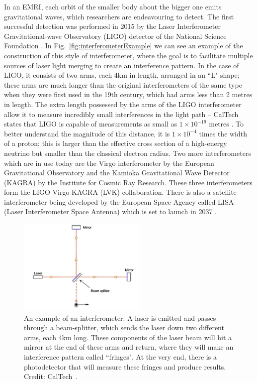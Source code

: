 In an EMRI, each orbit of the smaller body about the bigger one emits gravitational waves, which researchers are endeavouring to detect.
The first successful detection was performed in 2015 by the Laser Interferometer Gravitational-wave Observatory (LIGO) detector of the National Science Foundation \cite{gravWaveDetectPaper}.
In Fig.~\eqref{fig:interferometerExample} we can see an example of the construction of this style of interferometer, where the goal is to facilitate multiple sources of laser light merging to create an interference pattern.
In the case of LIGO, it consists of two arms, each 4km in length, arranged in an ``L" shape; these arms are much longer than the original interferometers of the same type when they were first used in the 19th century, which had arms less than 2 metres in length.
The extra length possessed by the arms of the LIGO interferometer allow it to measure incredibly small interferences in the light path -- CalTech states that LIGO is capable of measurements as small as $1\times10^{-19}$ metres \cite{LIGOSummary}.
To better understand the magnitude of this distance, it is $1\times10^{-4}$ times the width of a proton; this is larger than the effective cross section of a high-energy neutrino but smaller than the classical electron radius.
Two more interferometers which are in use today are the Virgo interferometer by the European Gravitational Observatory and the Kamioka Gravitational Wave Detector (KAGRA) by the Institute for Cosmic Ray Research.
These three interferometers form the LIGO-Virgo-KAGRA (LVK) collaboration.
There is also a satellite interferometer being developed by the European Space Agency called LISA (Laser Interferometer Space Antenna) which is set to launch in 2037 \cite{LISASummary}.

\begin{figure}
    \centering
    \includegraphics[width=0.55\textwidth]{images/Basic_michelson_labeled.pdf}
    \caption[Example of an interferometer]{An example of an interferometer. A laser is emitted and passes through a beam-splitter, which sends the laser down two different arms, each 4km long. These components of the laser beam will hit a mirror at the end of these arms and return, where they will make an interference pattern called ``fringes". At the very end, there is a photodetector that will measure these fringes and produce results. Credit: CalTech~\cite{LIGOSummary}.}
    \label{fig:interferometerExample}
\end{figure}

